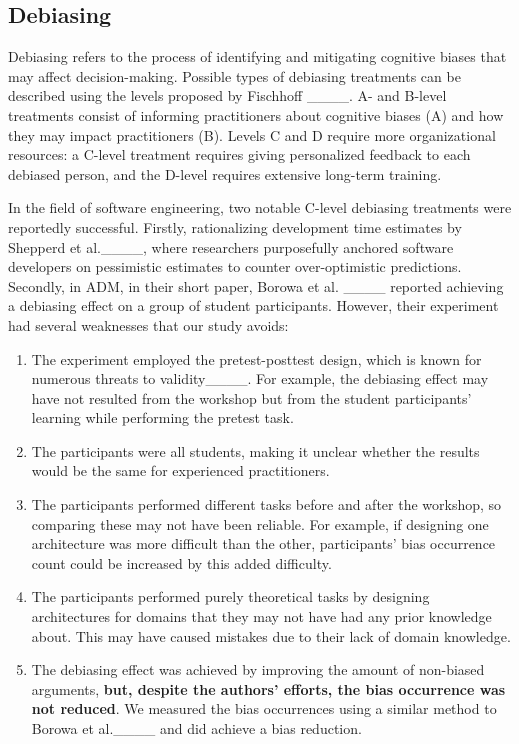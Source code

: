     \subsection{Debiasing} 
Debiasing refers to the process of identifying and mitigating cognitive biases that may affect decision-making.
    Possible types of debiasing treatments can be described using the levels proposed by Fischhoff ____. A- and B-level treatments consist of informing practitioners about cognitive biases (A) and how they may impact practitioners (B). Levels C and D require more organizational resources: a C-level treatment requires giving personalized feedback to each debiased person, and the D-level requires extensive long-term training.

    In the field of software engineering, two notable C-level debiasing treatments were reportedly successful. Firstly,  rationalizing development time estimates by Shepperd et al.____, where researchers purposefully anchored software developers on pessimistic estimates to counter over-optimistic predictions.     
    Secondly, in ADM, in their short paper, Borowa et al. ____ reported achieving a debiasing effect on a group of student participants. However, their experiment had several weaknesses that our study avoids:
    \begin{enumerate}
        \item The experiment employed the pretest-posttest design, which is known for numerous threats to validity____. For example, the debiasing effect may have not resulted from the workshop but from the student participants' learning while performing the pretest task.
        \item The participants were all students\color{black}, making it unclear whether the results would be the same for \color{black} experienced practitioners.
        \item The participants performed different tasks before and after the workshop, so comparing these may not have been reliable. 
        \color{black}
        For example, if designing one architecture was more difficult than the other, participants' bias occurrence count could be increased by this added difficulty. 
        \color{black}
        \item The participants performed purely theoretical tasks by designing architectures for domains that they may not have had any prior knowledge about. This may have caused mistakes due to their lack of domain knowledge.
        \color{black}
        \item The debiasing effect was achieved by improving the amount of non-biased arguments, \textbf{but, despite the authors' efforts, the bias occurrence was not reduced}. We measured the bias occurrences using a similar method to Borowa et al.____ and did achieve a bias reduction. 
        \color{black}
    \end{enumerate}
    
